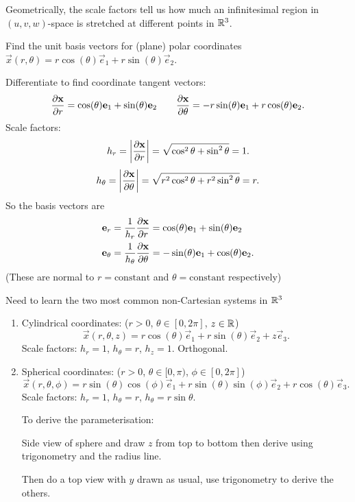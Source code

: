 \documentclass[10pt, a4paper]{article}
\begin{document}
Geometrically,
the scale factors tell us how much an infinitesimal region in $(u, v, w)$-space is stretched at different points in $\R ^ 3$.

\begin{example}
    Find the unit basis vectors for
    (plane)
    polar coordinates $\vec{x}(r, \theta) = r\cos(\theta)\vec{e}_1 + r\sin(\theta)\vec{e}_2$.

    \begin{solution}
        Differentiate to find coordinate tangent vectors:
        \[
        \pd[\vec{x}]{r} = \cos(\theta)\vec{e}_1 + \sin(\theta)\vec{e}_2\qquad\pd[\vec{x}]{\theta} = -r\sin(\theta)\vec{e}_1 + r\cos(\theta)\vec{e}_2.
        \]
        Scale factors:
        \[
        h_r = \left|\pd[\vec{x}]{r}\right| = \sqrt{\cos ^ 2\theta + \sin ^ 2\theta} = 1.
        \]
        \[
        h_{\theta} = \left|\pd[\vec{x}]{\theta}\right| = \sqrt{r ^ 2\cos ^ 2\theta + r ^ 2\sin ^ 2\theta} = r.
        \]
        So the basis vectors are
        \begin{align*}
            \vec{e}_r &= \frac{1}{h_r}\pd[\vec{x}]{r} = \cos(\theta)\vec{e}_1 + \sin(\theta)\vec{e}_2 \\
            \vec{e}_{\theta} &= \frac{1}{h_{\theta}}\pd[\vec{x}]{\theta} = -\sin(\theta)\vec{e}_1 + \cos(\theta)\vec{e}_2.
        \end{align*}
        (These are normal to $r = \text{constant}$ and $\theta = \text{constant}$ respectively)
    \end{solution}
\end{example}

Need to learn the two most common non-Cartesian systems in $\R ^ 3$
\begin{enumerate}[label = (\roman*)]
    \item Cylindrical coordinates:
    ($r > 0$,
    $\theta \in [0, 2\pi]$,
    $z \in \R$)
    \[
    \vec{x}(r, \theta, z) = r\cos(\theta)\vec{e}_1 + r\sin(\theta)\vec{e}_2 + z\vec{e}_3.
    \]
    Scale factors:
    $h_r = 1$,
    $h_{\theta} = r$,
    $h_z = 1$.
    Orthogonal.

    \item Spherical coordinates:
    ($r > 0$,
    $\theta \in [0, \pi)$,
    $\phi \in [0, 2\pi]$)
    \[
    \vec{x}(r, \theta, \phi) = r\sin(\theta)\cos(\phi)\vec{e}_1 + r\sin(\theta)\sin(\phi)\vec{e}_2 + r\cos(\theta)\vec{e}_3.
    \]
    Scale factors:
    $h_r = 1$,
    $h_{\theta} = r$,
    $h_{\theta} = r\sin{\theta}$.

    To derive the parameterisation:

    Side view of sphere and draw $z$ from top to bottom then derive using trigonometry and the radius line.

    Then do a top view with $y$ drawn as usual,
    use trigonometry to derive the others.
\end{enumerate}
\end{document}
